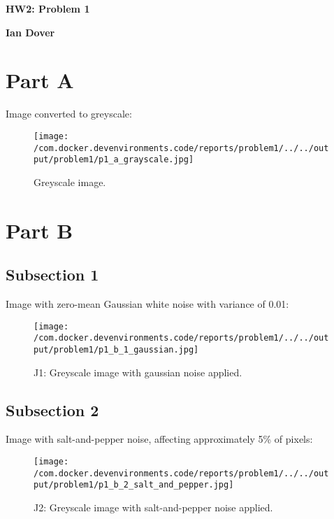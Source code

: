 \documentclass{article}%
\begin{document}
%
\normalsize%
\pagestyle{header}%
\begin{minipage}{\textwidth}%
\centering%
\begin{Large}%
\textbf{HW2: Problem 1}%
\end{Large}%
\linebreak%
\begin{large}%
\textbf{Ian Dover}%
\end{large}%
\end{minipage}%
\section{Part A}%
\label{sec:PartA}%
Image converted to greyscale:%


\begin{figure}[h!]%
\centering%
\texttt{[image: /com.docker.devenvironments.code/reports/problem1/../../output/problem1/p1\_a\_grayscale.jpg]}%
\caption{Greyscale image.}%
\end{figure}

%
\section{Part B}%
\label{sec:PartB}%
\subsection{Subsection 1}%
\label{subsec:Subsection1}%
Image with zero{-}mean Gaussian white noise with variance of 0.01:%


\begin{figure}[h!]%
\centering%
\texttt{[image: /com.docker.devenvironments.code/reports/problem1/../../output/problem1/p1\_b\_1\_gaussian.jpg]}%
\caption{J1: Greyscale image with gaussian noise applied.}%
\end{figure}

%
\subsection{Subsection 2}%
\label{subsec:Subsection2}%
Image with salt{-}and{-}pepper noise, affecting approximately 5\% of pixels:%


\begin{figure}[h!]%
\centering%
\texttt{[image: /com.docker.devenvironments.code/reports/problem1/../../output/problem1/p1\_b\_2\_salt\_and\_pepper.jpg]}%
\caption{J2: Greyscale image with salt{-}and{-}pepper noise applied.}%
\end{figure}
\end{document}
